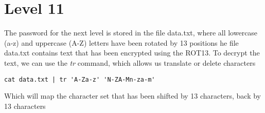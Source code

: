 \documentclass{report}
\begin{document}
    \bigbreak \noindent 
    \section*{Level 11}
    \bigbreak \noindent 
    The password for the next level is stored in the file data.txt, where all lowercase (a-z) and uppercase (A-Z) letters have been rotated by 13 positions
    \bigbreak \noindent 
    he file data.txt contains text that has been encrypted using the ROT13. To decrypt the text, we can use the \textit{tr} command, which allows us translate or delete characters
    \bigbreak \noindent 
    \begin{verbatim}
cat data.txt | tr 'A-Za-z' 'N-ZA-Mn-za-m'
    \end{verbatim}
    \bigbreak \noindent
    Which will map the character set that has been shifted by 13 characters, back by 13 characters










    
\end{document}
